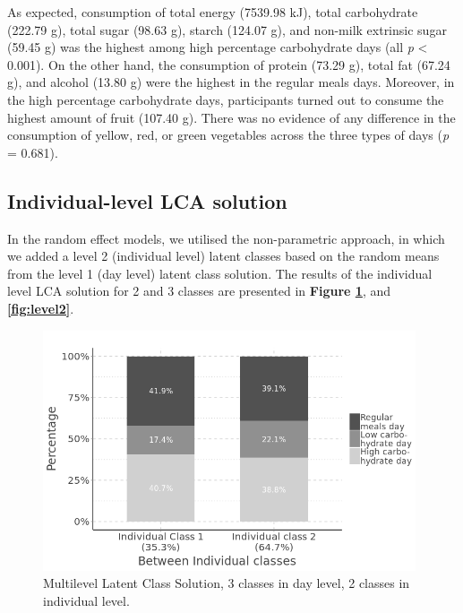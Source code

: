 As expected, consumption of total energy (7539.98 kJ), total carbohydrate (222.79 g), total sugar (98.63 g), starch (124.07 g), and non-milk extrinsic sugar (59.45 g) was the highest among high percentage carbohydrate days (all \textit{p} < 0.001). On the other hand, the consumption of protein (73.29 g), total fat (67.24 g), and alcohol (13.80 g) were the highest in the regular meals days. Moreover, in the high percentage carbohydrate days, participants turned out to consume the highest amount of fruit (107.40 g). There was no evidence of any difference in the consumption of yellow, red, or green vegetables across the three types of days (\textit{p} = 0.681).\vspace{-0.6cm}


\subsection{Individual-level LCA solution}\vspace{-0.3cm}

In the random effect models, we utilised the non-parametric approach, in which we added a level 2 (individual level) latent classes based on the random means from the level 1 (day level) latent class solution. The results of the individual level LCA solution for 2 and 3 classes are presented in \textbf{Figure \ref{fig:CB2level2}}, and \textbf{\ref{fig:level2}}. 


\begin{figure}[H]
	\centering
	\includegraphics[width=11cm]{Figures/CB2level2.png}
	\decoRule
	\caption[Multilevel Latent Class Solution ($3\times2$).]{Multilevel Latent Class Solution, 3 classes in day level, 2 classes in individual level.}
	\label{fig:CB2level2}
\end{figure}

